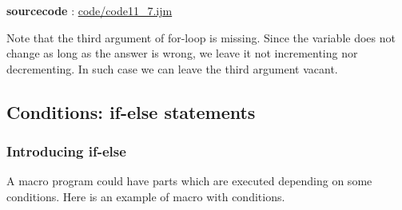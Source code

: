 \textbf{sourcecode} : \href{http://www.example.com/contents}{code/code11\_7.ijm}

Note that the third argument of for-loop is missing. Since the variable
 does not change as long as the answer is wrong, we leave it not
incrementing nor decrementing. In such case we can leave the third argument
vacant.

\subsection{Conditions: if-else statements}

\subsubsection{Introducing if-else}
A macro program could have parts which are executed depending on some
conditions.
Here is an example of macro with conditions.